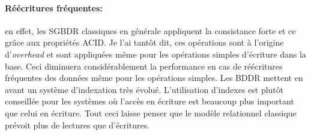 \paragraph{Réécritures fréquentes:}  en effet, les \textsf{SGBDR} classiques en générale
appliquent la consistance forte et ce grâce aux propriétés \textsf{ACID}. 
Je l'ai tantôt dit, ces opérations sont à l'origine d'\textit{overhead} 
et sont appliquées même pour les opérations simples d'écriture dans la base. Ceci diminuera
considérablement la performance en cas de réécritures fréquentes des données même pour
les opérations simples.
Les \textsf{BDDR} mettent en avant un système d'indexation très évolué. L'utilisation
d'indexes est plutôt conseillée pour les systèmes où l'accès en écriture est
beaucoup plus important que celui en écriture. Tout ceci laisse penser que le modèle relationnel
classique prévoit plus de lectures que d'écritures. 

